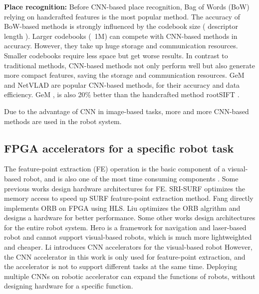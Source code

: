 \textbf{Place recognition:} Before CNN-based place recognition, Bag of Words (BoW) \cite{small_1} relying on handcrafted features is the most popular method. The accuracy of BoW-based methods is strongly influenced by the codebook size ( descriptor length ). Larger codebooks (~1M) \cite{large_1, large_2} can compete with CNN-based methods in accuracy. However, they take up huge storage and communication resources. Smaller codebooks\cite{small_1, small_2, jegou2014triang} require less space but get worse results. In contrast to traditional methods, CNN-based methods not only perform well but also generate more compact features, saving the storage and communication resources. GeM \cite{radenovic2018fine} and NetVLAD \cite{arandjelovic2016netvlad} are popular CNN-based methods, for their accuracy and data efficiency. GeM \cite{radenovic2018fine}, is also 20\% better than the handcrafted method rootSIFT \cite{jegou2014triang}.

Due to the advantage of CNN in image-based tasks, more and more CNN-based methods are used in the robot system.


\subsection{ FPGA accelerators for a specific robot task }

The feature-point extraction (FE) operation is the basic component of a visual-based robot, and is also one of the most time consuming components \cite{fang2017fpga}.
Some previous works design hardware architectures for FE.
SRI-SURF \cite{jia2016sri} optimizes the memory access to speed up SURF \cite{bay2006surf} feature-point extraction method. 
Fang \cite{fang2017fpga} directly implements ORB on FPGA using HLS. Liu \cite{liu2019eslam} optimizes the ORB algrithm and designs a hardware for better performance.
Some other works design architectures for the entire robot system. Hero \cite{shi2018hero} is a framework for navigation and laser-based robot and cannot support visual-based robots, which is much more lightweighted and cheaper. 
Li \cite{li2019879gops} introduces CNN accelerators for the visual-based robot
However, the CNN accelerator in this work\cite{li2019879gops} is only used for feature-point extraction, and the accelerator is not to support different tasks at the same time. 
Deploying multiple CNNs on robotic accelerator can expand the functions of robots, without designing hardware for a specific function.



